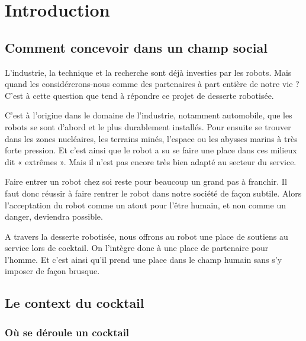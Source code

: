 \chapter*{Introduction}


\section{Comment concevoir dans un champ social}

L’industrie, la technique et la recherche sont déjà investies par les robots. Mais quand les considérerons-nous comme des partenaires à part entière de notre vie ? C’est à cette question que tend à répondre ce projet de desserte robotisée.

C’est à l’origine dans le domaine de l’industrie, notamment automobile, que les robots se sont d’abord et le plus durablement installés. Pour ensuite se trouver dans les zones nucléaires, les terrains minés, l’espace ou les abysses marins à très forte pression. Et c’est ainsi que le robot a su se faire une place dans ces milieux dit « extrêmes ». Mais il n’est pas encore très bien adapté au secteur du service.

Faire entrer un robot chez soi reste pour beaucoup un grand pas à franchir. Il faut donc réussir à faire rentrer le robot dans notre société de façon subtile. Alors l’acceptation du robot comme un atout pour l’être humain, et non comme un danger, deviendra possible.

A travers la desserte robotisée, nous offrons au robot une place de soutiens au service lors de cocktail. On l’intègre donc à une place de partenaire pour l’homme. Et c’est ainsi qu’il prend une place dans le champ humain sans s’y imposer de façon brusque.


\section{Le context du cocktail}

\subsection{Où se déroule un cocktail}

